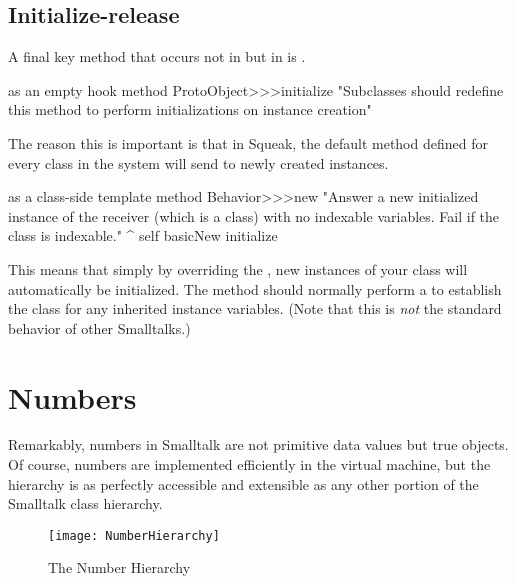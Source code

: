 \documentclass[a4paper,10pt,twoside]{book}
\begin{document}
\subsection{Initialize-release}

A final key method that occurs not in  but in  is .

\begin{method}{ as an empty hook method}
ProtoObject>>>initialize
    "Subclasses should redefine this method to perform initializations on instance creation"
\end{method}

The reason this is important is that in Squeak, the default  method defined for every class in the system will send  to newly created instances.

\begin{method}{ as a class-side template method}
Behavior>>>new
    "Answer a new initialized instance of the receiver (which is a class) with no indexable variables. Fail if the class is indexable."
    ^ self basicNew initialize
\end{method}

This means that simply by overriding the  , new instances of your class will automatically be initialized.
The  method should normally perform a  to establish the class  for any inherited instance variables.
(Note that this is \emph{not} the standard behavior of other Smalltalks.)

\section{Numbers}
\label{sec:Number}
Remarkably, numbers in Smalltalk are not primitive data values but true objects.
Of course, numbers are implemented efficiently in the virtual machine, but the  hierarchy is as perfectly accessible and extensible as any other portion of the Smalltalk class hierarchy.

\begin{figure}[ht]
\centerline {\texttt{[image: NumberHierarchy]}}
\caption{The Number Hierarchy \label{fig:numbers}}
\end{figure}
\end{document}
